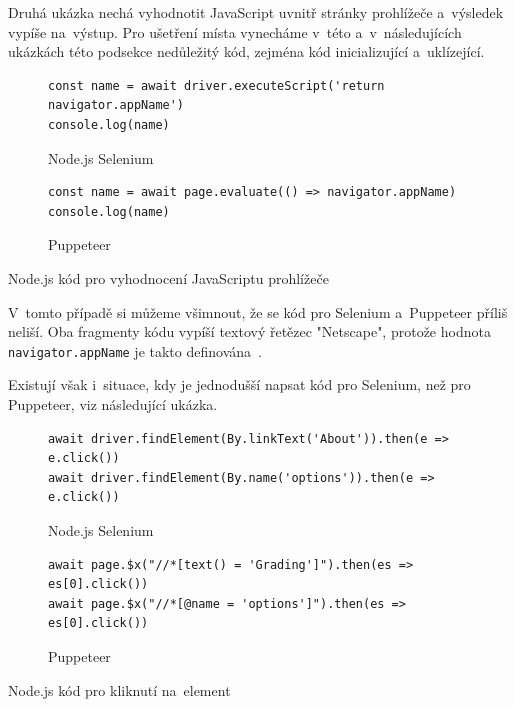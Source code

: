 \documentclass[12pt, a4paper, twoside]{article}
\begin{document}
	Druhá ukázka nechá vyhodnotit JavaScript uvnitř stránky prohlížeče a~výsledek vypíše na~výstup. Pro ušetření místa vynecháme v~této a~v~následujících ukázkách této podsekce nedůležitý kód, zejména kód inicializující a~uklízející.
	\newpage
		 \begin{codefigure}[H]
		\begin{subfigure}[t]{\textwidth}
			\begin{lstlisting}[style=MyJavaScript]
const name = await driver.executeScript('return navigator.appName')
console.log(name)
			\end{lstlisting}
			\caption{Node.js Selenium}
		\end{subfigure}   
	\end{codefigure}
	\begin{codefigure}[H]\ContinuedFloat
		\begin{subfigure}[t]{\textwidth}
			\begin{lstlisting}[style=MyJavaScript]
const name = await page.evaluate(() => navigator.appName)
console.log(name)
			\end{lstlisting}
			\caption{Puppeteer}
		\end{subfigure}
		\caption{Node.js kód pro vyhodnocení JavaScriptu prohlížeče}
	\end{codefigure}

	V~tomto případě si můžeme všimnout, že se kód pro Selenium a~Puppeteer příliš neliší. Oba fragmenty kódu vypíší textový řetězec "Netscape", protože hodnota \texttt{navigator.appName} je takto definována~\cite{navigator.appName}.
	
	Existují však i~situace, kdy je jednodušší napsat kód pro Selenium, než pro Puppeteer, viz následující ukázka.
\begin{codefigure}[H]
	\begin{subfigure}[t]{\textwidth}
		\begin{lstlisting}[style=MyJavaScript]
await driver.findElement(By.linkText('About')).then(e => e.click())
await driver.findElement(By.name('options')).then(e => e.click())
		\end{lstlisting}
		\caption{Node.js Selenium}
	\end{subfigure}   
\end{codefigure}
\begin{codefigure}[H]\ContinuedFloat
	\begin{subfigure}[t]{\textwidth}
		\begin{lstlisting}[style=MyJavaScript]
await page.$x("//*[text() = 'Grading']").then(es => es[0].click())
await page.$x("//*[@name = 'options']").then(es => es[0].click())
		\end{lstlisting}
		\caption{Puppeteer}
	\end{subfigure}
	\caption{Node.js kód pro kliknutí na~element}
\end{codefigure}
\end{document}
